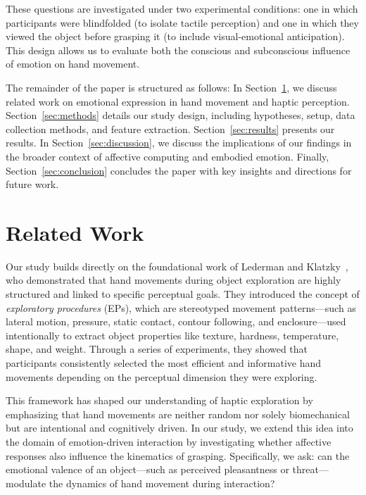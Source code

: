 \documentclass[conference]{IEEEtran}
\begin{document}
These questions are investigated under two experimental conditions: one in which participants were blindfolded (to isolate tactile perception) and one in which they viewed the object before grasping it (to include visual-emotional anticipation). This design allows us to evaluate both the conscious and subconscious influence of emotion on hand movement.

The remainder of the paper is structured as follows: In Section~\ref{sec:relatedwork}, we discuss related work on emotional expression in hand movement and haptic perception. Section~\ref{sec:methods} details our study design, including hypotheses, setup, data collection methods, and feature extraction. Section~\ref{sec:results} presents our results. In Section~\ref{sec:discussion}, we discuss the implications of our findings in the broader context of affective computing and embodied emotion. Finally, Section~\ref{sec:conclusion} concludes the paper with key insights and directions for future work.

\section{Related Work}
\label{sec:relatedwork}

Our study builds directly on the foundational work of Lederman and Klatzky~\cite{b1}, who demonstrated that hand movements during object exploration are highly structured and linked to specific perceptual goals. They introduced the concept of \textit{exploratory procedures} (EPs), which are stereotyped movement patterns---such as lateral motion, pressure, static contact, contour following, and enclosure---used intentionally to extract object properties like texture, hardness, temperature, shape, and weight. Through a series of experiments, they showed that participants consistently selected the most efficient and informative hand movements depending on the perceptual dimension they were exploring.

This framework has shaped our understanding of haptic exploration by emphasizing that hand movements are neither random nor solely biomechanical but are intentional and cognitively driven. In our study, we extend this idea into the domain of emotion-driven interaction by investigating whether affective responses also influence the kinematics of grasping. Specifically, we ask: can the emotional valence of an object---such as perceived pleasantness or threat---modulate the dynamics of hand movement during interaction?
\end{document}
